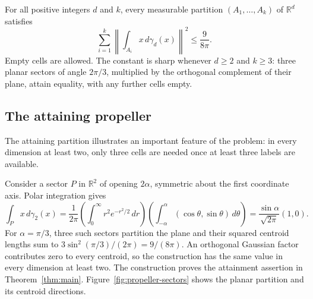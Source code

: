 \begin{theorem}\label{thm:main}
For all positive integers $d$ and $k$, every measurable partition
$(A_1,\ldots,A_k)$ of $\mathbb R^d$ satisfies
\[
 \sum_{i=1}^k\left\|\int_{A_i}x\,d\gamma_d(x)\right\|^2
 \le\frac9{8\pi}.
\]
Empty cells are allowed. The constant is sharp whenever $d\ge2$ and
$k\ge3$: three planar sectors of angle $2\pi/3$, multiplied by the
orthogonal complement of their plane, attain equality, with any further
cells empty.
\end{theorem}

\subsection{The attaining propeller}
\label{sec:example}
The attaining partition illustrates an important feature of the
problem: in every dimension at least two, only three cells are needed
once at least three labels are available.

Consider a sector $P$ in $\mathbb R^2$ of opening
$2\alpha$, symmetric about the first coordinate axis. Polar integration
gives
\[
 \int_P x\,d\gamma_2(x)
 =\frac1{2\pi}\left(\int_0^\infty r^2e^{-r^2/2}\,dr\right)
      \left(\int_{-\alpha}^{\alpha}(\cos\theta,\sin\theta)\,d\theta\right)
 =\frac{\sin\alpha}{\sqrt{2\pi}}(1,0).
\]
For $\alpha=\pi/3$, three such sectors partition the plane and their
squared centroid lengths sum to
$3\sin^2(\pi/3)/(2\pi)=9/(8\pi)$.
An orthogonal Gaussian factor contributes zero to every centroid, so
the construction has the same value in every dimension at least two.
The construction proves the attainment assertion in
Theorem~\ref{thm:main}.
Figure~\ref{fig:propeller-sectors} shows the planar partition and its
centroid directions.
